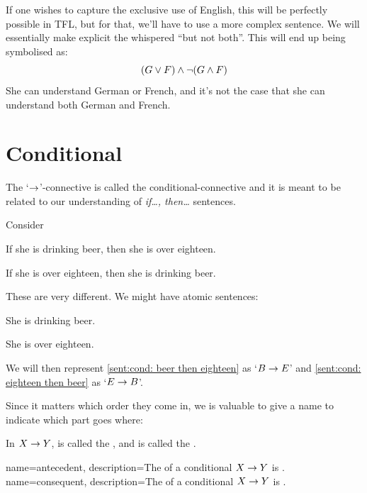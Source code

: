 If one wishes to capture the exclusive use of English, this will be perfectly possible in TFL, but for that, we'll have to use a more complex sentence. We will essentially make explicit the whispered ``but not both''. This will end up being symbolised as:
$$(G\vee F)\mathbin{\wedge}\neg (G\mathbin{\wedge} F)$$
She can understand German or French, and it's not the case that she can understand both German and French.  

\section{Conditional}

The `$\rightarrow$'-connective is called the conditional-connective and it is meant to be related to our understanding of \emph{if\ldots, then\ldots} sentences. 

Consider
\begin{samplesent}
	\item\label{sent:cond: beer then eighteen} If she is drinking beer, then she is over eighteen.
	\item\label{sent:cond: eighteen then beer} If she is over eighteen, then she is drinking beer.
\end{samplesent}
These are very different. We might have atomic sentences:
\begin{ekey}
	\item[B] She is drinking beer.
	\item[E] She is over eighteen.
\end{ekey}
We will then represent \cref{sent:cond: beer then eighteen} as `$B\rightarrow E$' and \cref{sent:cond: eighteen then beer} as `$E\rightarrow B$'. 


Since it matters which order they come in, we is valuable to give a name to indicate which part goes where:
\begin{definition}
	In $X\rightarrow Y$, \metaX is called the , and \metaY is called the .
\end{definition}

{
	name=antecedent,
	description={The   of a conditional $X\rightarrow Y$ is \metaX.}
}
{
	name=consequent,
	description={The   of a conditional $X\rightarrow Y$ is \metaY.}
}


